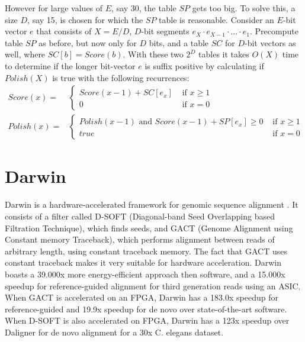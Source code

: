 \documentclass[../thesis.tex]{subfiles}
\begin{document}
However for large values of $E$, say 30, the table $SP$ gets too big.
To solve this, a size $D$, say 15, is chosen for which the $SP$ table is reasonable.
Consider an $E$-bit vector $e$ that consists of $X=E/D$, $D$-bit segments $e_X\cdot e_{X-1}\cdot ... \cdot e_1$.
Precompute table $SP$ as before, but now only for $D$ bits, and a table $SC$ for $D$-bit vectors as well, where $SC[b] = Score(b)$.
With these two $2^D$ tables it takes $O(X)$ time to determine if the longer bit-vector $e$ is suffix positive by calculating if $Polish(X)$ is true with the following recurrences:
\begin{align}
Score(x) = &\begin{cases}
Score(x-1) + SC[e_x] &\text{ if } x \ge 1 \\
0&\text{ if } x = 0
\end{cases} \\
Polish(x) = &\begin{cases}
Polish(x-1) \text{ and } Score(x-1) + SP[e_x] \ge 0 &\text{ if } x \ge 1 \\
true &\text{ if } x = 0
\end{cases}
\end{align}


\section{Darwin}
Darwin is a hardware-accelerated framework for genomic sequence alignment \cite{Darwin1}\cite{Darwin2}.
It consists of a filter called D-SOFT (Diagonal-band Seed Overlapping based Filtration Technique), which finds seeds, and GACT (Genome Alignment using Constant memory Traceback), which performs alignment between reads of arbitrary length, using constant traceback memory.
The fact that GACT uses constant traceback makes it very suitable for hardware acceleration.
Darwin boasts a 39.000x more energy-efficient approach then software, and a 15.000x speedup for reference-guided alignment for third generation reads using an ASIC.
When GACT is accelerated on an FPGA, Darwin has a 183.0x speedup for reference-guided and 19.9x speedup for de novo over state-of-the-art software.
When D-SOFT is also accelerated on FPGA, Darwin has a 123x speedup over Daligner for de novo alignment for a 30x C. elegans dataset.
\end{document}
